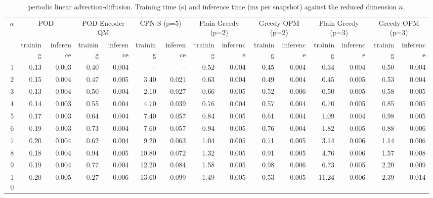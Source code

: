 \begin{table}[tb]
  \centering
  \caption{periodic linear advection-diffusion. Training time (s) and inference time (ms per snapshot) against the reduced dimension \( n \).}
  \label{tab:lin_adv_diff_timings}
  \small
  \setlength{\tabcolsep}{4pt}
  \begin{tabular}{rrrrrrrrrrrrrrr}
    \toprule
    \multirow{2}{*}{\( n \)} & \multicolumn{2}{c}{POD} & \multicolumn{2}{c}{POD-Encoder QM} & \multicolumn{2}{c}{CPN-S (p=5)} & \multicolumn{2}{c}{Plain Greedy (p=2)} & \multicolumn{2}{c}{Greedy-OPM (p=2)} & \multicolumn{2}{c}{Plain Greedy (p=3)} & \multicolumn{2}{c}{Greedy-OPM (p=3)} \\
    \cmidrule(lr){2-3} \cmidrule(lr){4-5} \cmidrule(lr){6-7} \cmidrule(lr){8-9} \cmidrule(lr){10-11} \cmidrule(lr){12-13} \cmidrule(lr){14-15}
     & training & inference & training & inference & training & inference & training & inference & training & inference & training & inference & training & inference \\
    \midrule
    1 & 0.13 & 0.003 & 0.40 & 0.004 & -- & -- & 0.52 & 0.004 & 0.45 & 0.004 & 0.34 & 0.004 & 0.50 & 0.004 \\
    2 & 0.15 & 0.004 & 0.47 & 0.005 & 3.40 & 0.021 & 0.63 & 0.004 & 0.49 & 0.004 & 0.45 & 0.005 & 0.53 & 0.004 \\
    3 & 0.13 & 0.004 & 0.50 & 0.004 & 2.10 & 0.027 & 0.66 & 0.005 & 0.52 & 0.006 & 0.50 & 0.005 & 0.58 & 0.005 \\
    4 & 0.14 & 0.003 & 0.55 & 0.004 & 4.70 & 0.039 & 0.76 & 0.004 & 0.57 & 0.004 & 0.70 & 0.005 & 0.85 & 0.005 \\
    5 & 0.17 & 0.003 & 0.64 & 0.004 & 7.40 & 0.057 & 0.84 & 0.005 & 0.61 & 0.004 & 1.09 & 0.004 & 0.98 & 0.005 \\
    6 & 0.19 & 0.003 & 0.73 & 0.004 & 7.60 & 0.057 & 0.94 & 0.005 & 0.76 & 0.004 & 1.82 & 0.005 & 0.88 & 0.006 \\
    7 & 0.20 & 0.004 & 0.62 & 0.004 & 9.20 & 0.063 & 1.04 & 0.005 & 0.71 & 0.005 & 3.14 & 0.006 & 1.14 & 0.006 \\
    8 & 0.18 & 0.004 & 0.94 & 0.005 & 10.80 & 0.072 & 1.32 & 0.005 & 0.91 & 0.005 & 4.76 & 0.006 & 1.57 & 0.008 \\
    9 & 0.19 & 0.004 & 0.77 & 0.004 & 12.20 & 0.084 & 1.58 & 0.005 & 0.98 & 0.006 & 6.73 & 0.005 & 2.20 & 0.009 \\
    10 & 0.20 & 0.005 & 0.27 & 0.006 & 13.60 & 0.099 & 1.49 & 0.005 & 0.53 & 0.005 & 11.24 & 0.006 & 2.39 & 0.014 \\
    \bottomrule
  \end{tabular}
\end{table}
